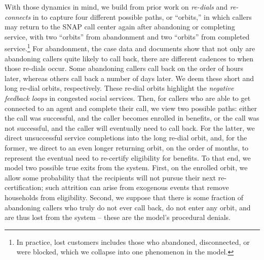 \documentclass[manuscript,screen,authorversion]{acmart}
\begin{document}
With those dynamics in mind, we build from prior work on \emph{re-dials} and \emph{re-connects} in \citet{ding2015fluid} to capture four different possible paths, or ``orbits,'' in which callers may return to the SNAP call center again after abandoning or completing service, with two ``orbits'' from abandonment and two ``orbits'' from completed service.\footnote{In practice, lost customers includes those who abandoned, disconnected, or were blocked, which we collapse into one phenomenon in the model.}
For abandonment, the case data and documents show that not only are abandoning callers quite likely to call back, there are different cadences to when those re-dials occur. Some abandoning callers call back on the order of hours later, whereas others call back a number of days later. We deem these short and long re-dial orbits, respectively. These re-dial orbits highlight the \textit{negative feedback loops} in congested social services. Then, for callers who are able to get connected to an agent and complete their call, we view two possible paths: either the call was successful, and the caller becomes enrolled in benefits, or the call was not successful, and the caller will eventually need to call back. For the latter, we direct unsuccessful service completions into the long re-dial orbit, and, for the former, we direct to an even longer returning orbit, on the order of months, to represent the eventual need to re-certify eligibility for benefits. To that end, we model two possible true exits from the system. First, on the enrolled orbit, we allow some probability that the recipients will not pursue their next re-certification; such attrition can arise from exogenous events that remove households from eligibility. Second, we suppose that there is some fraction of abandoning callers who truly do not ever call back, do not enter any orbit, and are thus lost from the system -- these are the model's procedural denials. 
\end{document}

